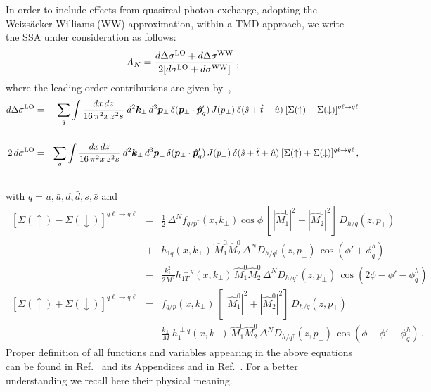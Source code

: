 \documentclass[nofootinbib,superscriptaddress,aps]{revtex4}
\newcommand{\be}{\begin{equation}}
\newcommand{\ee}{\end{equation}}
\newcommand{\bea}{\begin{eqnarray}}
\newcommand{\eea}{\end{eqnarray}}
\newcommand{\pup}{p^\uparrow}
\newcommand{\qup}{q^\uparrow}
\begin{document}
In order to include effects from quasireal photon exchange, adopting the Weizs\"acker-Williams (WW) approximation, within a TMD approach, we write the SSA under consideration as follows:
%
\be
\label{ANWW}
A_N = \frac{d\Delta\sigma^{\rm LO} + d\Delta\sigma^{\rm WW}}{2[ d\sigma^{\rm LO} + d\sigma^{\rm WW}]}\,,
\ee
where the leading-order contributions are given by~\cite{Anselmino:2009pn,Anselmino:2014eza},
\bea
d\Delta\sigma^{\rm LO} &=& {\displaystyle \sum_{q} \int \frac{dx \, dz}
{16\,\pi^2 x\,z^2 s}}\;
d^2 \bm{k}_{\perp} \, d^3 \bm{p}_{\perp}\,
\delta(\bm{p}_{\perp} \cdot \hat{\bm{p}}'_q) \, J(p_\perp)
\> \delta(\hat s + \hat t + \hat u)
\> [\Sigma(\uparrow) - \Sigma(\downarrow)]^{q \ell \to q \ell}\nonumber\\
&&\\
2\,d\sigma^{\rm LO} &=& {\displaystyle \sum_{q} \int \frac{dx \, dz}
{16\,\pi^2 x\,z^2 s}}\;
d^2 \bm{k}_{\perp} \, d^3 \bm{p}_{\perp}\,
\delta(\bm{p}_{\perp} \cdot \hat{\bm{p}}'_q) \, J(p_\perp)
\> \delta(\hat s + \hat t + \hat u)
\> [\Sigma(\uparrow) + \Sigma(\downarrow)]^{q \ell \to q \ell}\nonumber\,,\\
&&
\eea
with $q=u,\bar u, d, \bar d, s, \bar s$ and
\bea
\,[\Sigma(\uparrow) - \Sigma(\downarrow)]^{q \ell \to q \ell} &=&
\frac{1}{2} \, \Delta^N\! f_{q/\pup}(x,k_{\perp}) \cos\phi \, \left[\,|{\hat M}_1^0|^2 + |{\hat M}_2^0|^2 \right] \, D_{h/q} (z, p_{\perp})  \nonumber \\
&+& h_{1q}(x,k_{\perp}) \, \hat M_1^0 \hat M_2^0 \, \Delta^N\! D_{h/\qup} (z, p_{\perp}) \, \cos(\phi' + \phi_q^h) \nonumber\\
&-& \frac{k_\perp^2}{2M^2} h_{1T}^{\perp q}(x,k_{\perp}) \,\hat M_1^0 \hat M_2^0 \, \Delta^N\!D_{h/\qup}(z, p_{\perp}) \, \cos(2\phi - \phi' - \phi_q^h)
\label{ds1}\\
%
\,[\Sigma(\uparrow) + \Sigma(\downarrow)]^{q \ell \to q \ell} & = &
f_{q/p} (x,k_{\perp}) \, \left[\,|{\hat M}_1^0|^2 + |{\hat M}_2^0|^2 \right] \, D_{h/q} (z, p_{\perp}) \nonumber\\
\label{ss1}
&-& \frac{k_\perp}{M} \, h_{1}^{\perp q}(x,k_{\perp}) \, \hat M_1^0 \hat M_2^0 \, \Delta^N\!D_{h/\qup}(z, p_{\perp}) \, \cos(\phi- \phi' - \phi_q^h)\,.
\eea
%
Proper definition of all functions and variables appearing in the above equations can be found in Ref.~\cite{Anselmino:2009pn} and its Appendices and in Ref.~\cite{Anselmino:2005sh}. For a better understanding we recall here their physical meaning.
%
\end{document}
